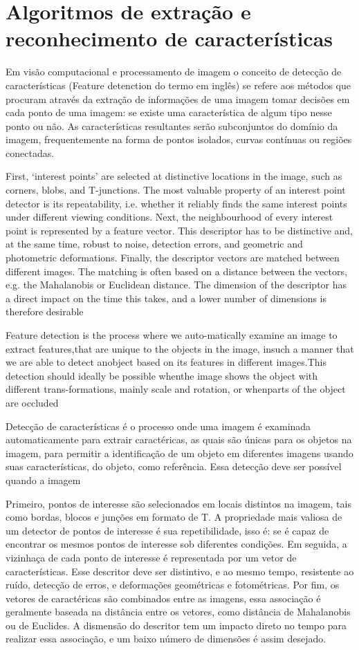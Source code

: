 \chapter{Algoritmos de extração e reconhecimento de características}

Em visão computacional e processamento de imagem o conceito de detecção de
características (Feature detenction do termo em inglês) se refere aos
métodos que procuram através da extração de informações de uma
imagem tomar decisões em cada ponto de uma imagem: se existe uma característica
de algum tipo nesse ponto ou não. As características resultantes serão
subconjuntos do domínio da imagem, frequentemente na forma de pontos isolados,
curvas contínuas ou regiões conectadas.

First, ‘interest points’ are selected at distinctive locations in the image,
such as corners, blobs, and T-junctions. The most valuable property of an
interest point detector is its repeatability, i.e. whether it reliably finds
the same interest points under different viewing conditions. Next, the
neighbourhood of every interest point is represented by a feature vector. This
descriptor has to be distinctive and, at the same time, robust to noise,
detection errors, and geometric and photometric deformations. Finally, the
descriptor vectors are matched between different images. The matching is often
based on a distance between the vectors, e.g. the Mahalanobis or Euclidean
distance. The dimension of the descriptor has a direct impact on the time this
takes, and a lower number of dimensions is therefore desirable

Feature detection is the process where we auto-matically examine an image to
extract features,that  are  unique  to  the  objects  in  the  image,  insuch
a  manner  that  we  are  able  to  detect  anobject based on its features in
different images.This detection should ideally be possible whenthe image shows
the object with different trans-formations, mainly scale and rotation, or
whenparts of the object are occluded

Detecção de características é o processo onde uma imagem é examinada
automaticamente para extrair caractéricas, as quais são únicas para os objetos
na imagem, para permitir a identificação de um objeto em diferentes imagens
usando suas características, do objeto, como referência. Essa detecção deve ser
possível quando a imagem

Primeiro, pontos de interesse são selecionados em locais distintos na imagem,
tais como bordas, blocos e junções em formato de T. A propriedade mais valiosa
de um detector de pontos de interesse é sua repetibilidade, isso é: se é capaz
de encontrar os mesmos pontos de interesse sob diferentes condições. Em
seguida, a vizinhaça de cada ponto de interesse é representada por um vetor de
características. Esse descritor deve ser distintivo, e ao mesmo tempo,
resistente ao ruído, detecção de erros, e deformações geométricas e
fotométricas. Por fim, os vetores de caractéricas são combinados entre as
imagens, essa associação é geralmente baseada na distância entre os vetores,
como distância de Mahalanobis ou de Euclides. A dismensão do descritor tem um
impacto direto no tempo para realizar essa associação, e um baixo número de
dimensões é assim desejado.

